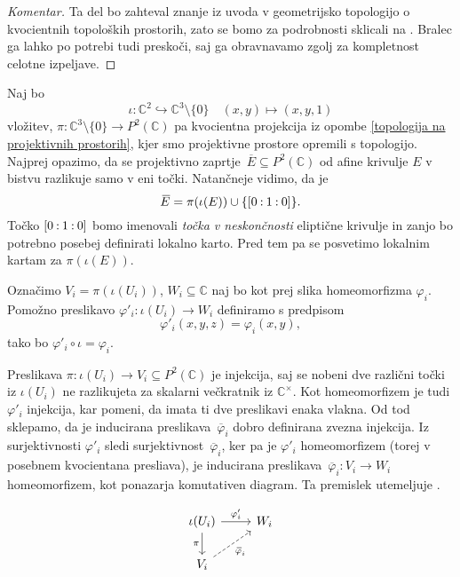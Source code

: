 \documentclass[mat1]{fmfdelo}
\newcommand{\C}{\mathbb C}
\newcommand{\CM}{\mathbb C ^\times}
\newcommand{\PC}{P^2(\mathbb C)}
\newcommand{\pcoor}[1]{%
  \begingroup\lccode`~=`: \lowercase{\endgroup
  \edef~}{\mathbin{\mathchar\the\mathcode`:}\nobreak}%
  [%
  \begingroup
  \mathcode`:=\string"8000
  #1%
  \endgroup
  ]%
}
\newcommand{\olsi}[1]{\,\overline{\!{#1}}} %
\theoremstyle{definition}
\newenvironment{komentar}[1][Komentar]{\begin{proof}[#1]\let\qed\relax}{\end{proof}}
\begin{document}
\begin{komentar}
    Ta del bo zahteval znanje iz uvoda v geometrijsko topologijo o kvocientnih topoloških prostorih, zato se bomo za podrobnosti sklicali na \cite[poglavje 3.2.]{MrcunTop}. Bralec ga lahko po potrebi tudi preskoči, saj ga obravnavamo zgolj za kompletnost celotne izpeljave. 
\end{komentar}

Naj bo 
\[
    \iota: \C^2 \hookrightarrow \C^3\setminus\{0\} \quad (x,y) \mapsto (x,y,1)
\]
vložitev, $\pi : \C^3 \setminus \{0\} \to \PC$ pa kvocientna projekcija iz opombe \ref{topologija na projektivnih prostorih}, kjer smo projektivne prostore opremili s topologijo. Najprej opazimo, da se projektivno zaprtje $\olsi{E} \subseteq \PC$ od afine krivulje $E$ v bistvu razlikuje samo v eni točki. Natančneje vidimo, da je 
\[
    \olsi{E} = \pi(\iota(E)) \cup \{\pcoor{0 : 1 : 0}\}.
\] 
Točko $\pcoor{0 : 1 : 0}$ bomo imenovali \emph{točka v neskončnosti} eliptične krivulje in zanjo bo potrebno posebej definirati lokalno karto. Pred tem pa se posvetimo lokalnim kartam za $\pi(\iota(E))$.

Označimo $V_i = \pi(\iota(U_i))$, $W_i \subseteq \C$ naj bo kot prej slika homeomorfizma $\varphi_i$. Pomožno preslikavo $\varphi'_i : \iota(U_i) \to W_i$ definiramo s predpisom 
\[
    \varphi'_i(x,y,z) = \varphi_i(x,y),
\]
tako bo $\varphi'_i \circ \iota = \varphi_i$.

Preslikava $\pi: \iota(U_i) \to V_i \subseteq \PC$ je injekcija, saj se nobeni dve različni točki iz $\iota(U_i)$ ne razlikujeta za skalarni večkratnik iz $\CM$. Kot homeomorfizem je tudi $\varphi'_i$ injekcija, kar pomeni, da imata ti dve preslikavi enaka vlakna. Od tod sklepamo, da je inducirana preslikava $\olsi{\varphi}_i$ dobro definirana zvezna injekcija. Iz surjektivnosti $\varphi'_i$ sledi surjektivnost $\olsi{\varphi}_i$, ker pa je $\varphi'_i$ homeomorfizem (torej v posebnem kvocientana presliava), je inducirana preslikava $\olsi{\varphi}_i : V_i \to W_i$ homeomorfizem, kot ponazarja komutativen diagram. Ta premislek utemeljuje \cite[Posledica 3.23]{MrcunTop}.

\[    
    \begin{tikzcd}
        \iota(U_i) \arrow{r}{\varphi'_i} \ar[labels=left]{d}{\pi} & W_i \\
        V_i \ar[dashed, labels=below right]{ur}{\olsi{\varphi}_i} 
    \end{tikzcd}
\]
\end{document}

